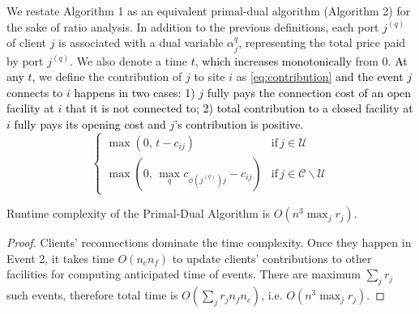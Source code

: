 \documentclass[10pt]{llncs}
\begin{document}
We restate Algorithm 1 as an equivalent primal-dual algorithm (Algorithm
2) for the sake of ratio analysis. In addition to the previous definitions,
each port $j^{\left(q\right)}$ of client $j$ is associated with
a dual variable $\alpha_{j}^{q}$, representing the total price paid
by port $j^{\left(q\right)}$. We also denote a time\textcolor{black}{{}
$t$}, \textcolor{black}{which increases monotonically} from 0.\textcolor{black}{{}
At any $t$, }we define the contribution of $j$ to site $i$ as\textcolor{black}{{}
\eqref{eq:contribution} and the event $j$ connects to $i$ happens
in two cases: 1) $j$ fully pays the connection cost of an open facility
at $i$ that it is not connected to; 2) total contribution to a closed
facility at $i$ fully pays its opening cost and $j$'s contribution
is positive.}{\footnotesize \begin{equation}
\begin{cases}
\max\left(0,\, t-c_{ij}\right) & \textrm{if}\, j\in\mathcal{\mathcal{U}}\\
\max\left(0,\,\max_{q}c_{\phi\left(j^{\left(q\right)}\right)j}-c_{ij}\right) & \textrm{if}\, j\in\mathcal{\mathcal{\mathcal{C}\backslash U}}\end{cases}\label{eq:contribution}\end{equation}
}{\footnotesize \par}
\begin{lemma}
Runtime complexity of the Primal-Dual Algorithm is $O\left(n^{3}\max_{j}r_{j}\right)$.\end{lemma}
\begin{proof}
Clients' reconnections dominate the time complexity. Once they happen
in Event 2, it takes time $O\left(n_{c}n_{f}\right)$ to update clients'
contributions to other facilities for computing anticipated time of
events. There are maximum $\sum_{j}r_{j}$ such events, therefore
total time is $O\left(\sum_{j}r_{j}n_{f}n_{c}\right)$, i.e. $O\left(n^{3}\max_{j}r_{j}\right)$.
\end{proof}
\end{document}
